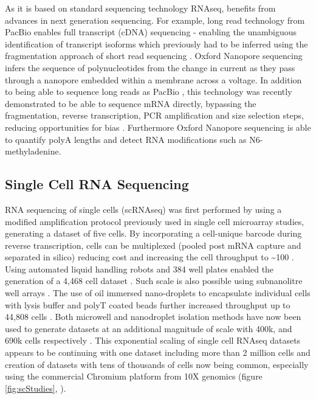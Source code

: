 As it is based on standard sequencing technology RNAseq, benefits from advances in next generation sequencing. For example, long read technology from PacBio enables full transcript (cDNA) sequencing - enabling the unambiguous identification of transcript isoforms which previously had to be inferred using the fragmentation approach of short read sequencing \parencite{Sharon2013singlemolecule, Cartolano2016cDNA}.
Oxford Nanopore sequencing infers the sequence of polynucleotides from the change in current as they pass through a nanopore embedded within a membrane across a voltage. In addition to being able to sequence long reads as PacBio \parencite{Oikonomopoulos2016Benchmarking}, this technology was recently demonstrated to be able to sequence mRNA directly, bypassing the fragmentation, reverse transcription, PCR amplification and size selection steps, reducing opportunities for bias \parencite{Garalde2018Highly, Workman2019Nanopore}. Furthermore Oxford Nanopore sequencing is able to quantify polyA lengths and detect RNA modifications such as N6-methyladenine.

\subsection{Single Cell RNA Sequencing}
RNA sequencing of single cells (scRNAseq) was first performed by \cite{Tang2009mRNASeq} using a modified amplification protocol previously used in single cell microarray studies, generating a dataset of five cells. By incorporating a cell-unique barcode during reverse transcription, cells can be multiplexed (pooled post mRNA capture and separated in silico) reducing cost and increasing the cell throughput to \textasciitilde100 \parencite{Islam2012Highly}. Using automated liquid handling robots and 384 well plates enabled the generation of a 4,468 cell dataset \parencite{Jaitin2014Massively}. Such scale is also possible using subnanolitre well arrays \parencite{Bose2015Scalable, Fan2015Combinatorial, Gierahn2017SeqWell}. The use of oil immersed nano-droplets to encapsulate individual cells with lysis buffer and polyT coated beads further increased throughput up to 44,808 cells \parencite{Macosko2015Highly, Klein2015Droplet}. Both microwell and nanodroplet isolation methods have now been used to generate datasets at an additional magnitude of scale with 400k, and 690k cells respectively \parencite{Saunders2018Molecular, Han2018Mapping}. This exponential scaling of single cell RNAseq datasets appears to be continuing with one dataset including more than 2 million cells \parencite{Cao2019singlecell} and creation of datasets with tens of thousands of cells now being common, especially using the commercial Chromium platform from 10X genomics (figure \ref{fig:scStudies}, \cite{Zheng2017Massively, Svensson2018Exponential}).

